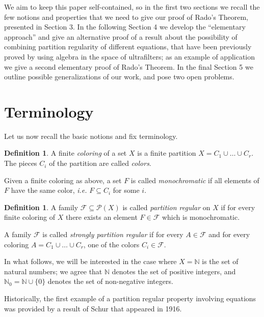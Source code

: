 \documentclass[a4paper,oneside]{article}
\newcommand{\N}{\mathbb{N}}
\newcommand{\PP}{\mathcal{P}}
\newcommand{\F}{\mathcal{F}}
\theoremstyle{definition}
\newtheorem{definition}[theorem]{Definition}
\theoremstyle{named}
\begin{document}
\smallskip
We aim to keep this paper self-contained, 
so in the first two sections we recall the few notions and properties that we need
to give our proof of Rado's Theorem, presented in Section 3. 
In the following Section 4 we develop the ``elementary approach'' and 
give an alternative proof of a result about the possibility
of combining partition regularity of different equations,
that have been previously proved by using algebra in the space of ultrafilters;
as an example of application we give a second elementary proof of Rado's Theorem.
In the final Section 5 we outline possible generalizations of our work,
and pose two open problems.

\medskip



\section{Terminology}

Let us now recall the basic notions and fix terminology.

\begin{definition}
{\rm A finite \emph{coloring} of a set $X$ is a finite partition $X=C_1\cup\ldots\cup C_r$.
The pieces $C_i$ of the partition are called \emph{colors}.

Given a finite coloring as above, a set $F$ is called \emph{monochromatic} 
if all elements of $F$ have the same color, \emph{i.e.} $F\subseteq C_i$ for some $i$.}
\end{definition}



\begin{definition}
A family $\F\subseteq\PP(X)$ is called \emph{partition regular} 
on $X$ if for every finite coloring of $X$ there exists an element $F\in\F$ which is monochromatic.

A family $\F$ is called \emph{strongly partition regular} 
if for every $A\in\F$ and for every coloring
$A=C_1\cup\ldots\cup C_r$, one of the colors $C_i\in\F$.
\end{definition}

In what follows, we will be interested in the case where $X=\N$ is the set of natural numbers; we agree that $\N$ denotes the set of positive integers,
and $\N_0=\N\cup\{0\}$ denotes the set of non-negative integers.

\smallskip
Historically, the first example of a partition regular property involving equations was provided by
a result of Schur \cite{sh} that appeared in 1916. 
\end{document}
